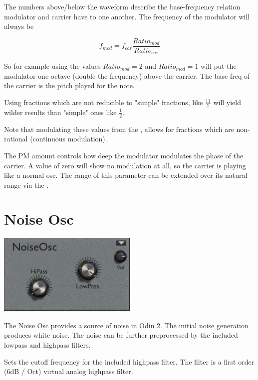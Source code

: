 {The numbers above/below the waveform describe the base-frequency relation modulator and carrier have to one another. The frequency of the modulator will always be

\begin{equation}
    f_{mod} = f_{car} \frac{Ratio_{mod}}{Ratio_{car}}
\end{equation}

So for example using the values $Ratio_{mod} = 2$ and $Ratio_{mod} = 1$ will put the modulator one octave (double the frequency) above the carrier. The base freq of the carrier is the pitch played for the note.

Using fractions which are not reducible to "simple" fractions, like $\frac{11}{7}$ will yield wilder results than "simple" ones like $\frac{1}{2}$.

Note that modulating these values from the \modmatrix, allows for fractions which are non-rational (continuous modulation).}

{The PM amount controls how deep the modulator modulates the phase of the carrier. A value of zero will show no modulation at all, so the carrier is playing like a normal osc. The range of this parameter can be extended over its natural range via the \modmatrix.}

\section{Noise Osc}
\begin{center}
    \includegraphics[width=0.5\textwidth]{graphics/noise_osc.png}
\end{center}

The Noise Osc provides a source of noise in Odin 2. The initial noise generation produces white noise. The noise can be further preprocessed by the included lowpass and highpass filters.

{Sets the cutoff frequency for the included highpass filter. The filter is a first order (6dB / Oct) virtual analog highpass filter.}

